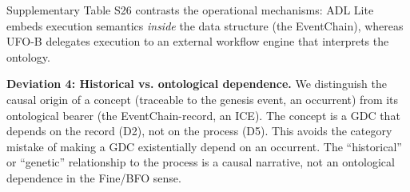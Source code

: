 Supplementary Table S26 contrasts the operational mechanisms: ADL Lite embeds execution semantics \emph{inside} the data structure (the EventChain), whereas UFO-B delegates execution to an external workflow engine that interprets the ontology.

\textbf{Deviation 4: Historical vs. ontological dependence.} We distinguish the causal origin of a concept (traceable to the genesis event, an occurrent) from its ontological bearer (the EventChain-record, an ICE). The concept is a GDC that depends on the record (D2), not on the process (D5). This avoids the category mistake of making a GDC existentially depend on an occurrent. The ``historical'' or ``genetic'' relationship to the process is a causal narrative, not an ontological dependence in the Fine/BFO sense.
